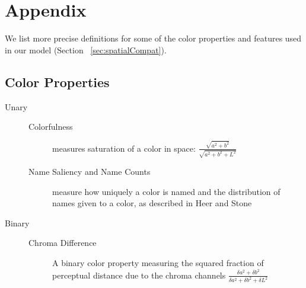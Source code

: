 \section*{Appendix}
\label{sec:appendix}

We list more precise definitions for some of the color properties and features used in our model (Section ~\ref{sec:spatialCompat}).

\subsection{Color Properties}
\begin{description}
\item[Unary] \hfill
	\begin{description}
	  \item[Colorfulness] measures saturation of a color in \lab space: $\frac{\sqrt{a^2+b^2}}{\sqrt{a^2+b^2+L^2}}$
	  \item[Name Saliency and Name Counts] measure how uniquely a color is named and the distribution of names given to a color, as described in Heer and Stone ~
	\end{description}
\item[Binary] \hfill
	\begin{description}
	  \item[Chroma Difference] A binary color property measuring the squared fraction of perceptual distance due to the chroma channels $\frac{\delta a^2+\delta b^2}{\delta a^2+\delta b^2+\delta L^2}$
	\end{description}
\end{description}
